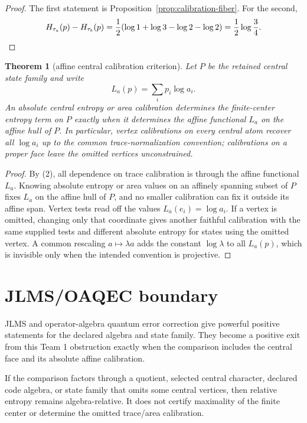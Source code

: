\documentclass[12pt]{article}
\newtheorem{theorem}{Theorem}
\theoremstyle{remark}
\begin{document}
\begin{proof}
The first statement is Proposition~\ref{prop:calibration-fiber}.  For the
second,
\[
  H_{\tau_a}(p)-H_{\tau_b}(p)
  =
  {1\over2}(\log1+\log3-\log2-\log2)
  =
  {1\over2}\log{3\over4}.
\]
\end{proof}

\begin{theorem}[affine central calibration criterion]
\label{thm:affine-calibration}
Let \(P\) be the retained central state family and write
\[
  L_a(p)=\sum_i p_i\log a_i .
\]
An absolute central entropy or area calibration determines the finite-center
entropy term on \(P\) exactly when it determines the affine functional \(L_a\)
on the affine hull of \(P\).  In particular, vertex calibrations on every
central atom recover all \(\log a_i\) up to the common trace-normalization
convention; calibrations on a proper face leave the omitted vertices
unconstrained.
\end{theorem}

\begin{proof}
By (2), all dependence on trace calibration is through the affine functional
\(L_a\).  Knowing absolute entropy or area values on an affinely spanning
subset of \(P\) fixes \(L_a\) on the affine hull of \(P\), and no smaller
calibration can fix it outside its affine span.  Vertex tests read off the
values \(L_a(e_i)=\log a_i\).  If a vertex is omitted, changing only that
coordinate gives another faithful calibration with the same supplied tests and
different absolute entropy for states using the omitted vertex.  A common
rescaling \(a\mapsto\lambda a\) adds the constant \(\log\lambda\) to all
\(L_a(p)\), which is invisible only when the intended convention is
projective.
\end{proof}

\section{JLMS/OAQEC boundary}

JLMS and operator-algebra quantum error correction give powerful positive
statements for the declared algebra and state family.  They become a positive
exit from this Team 1 obstruction exactly when the comparison includes the
central face and its absolute affine calibration.

If the comparison factors through a quotient, selected central character,
declared code algebra, or state family that omits some central vertices, then
relative entropy remains algebra-relative.  It does not certify maximality of
the finite center or determine the omitted trace/area calibration.
\end{document}
